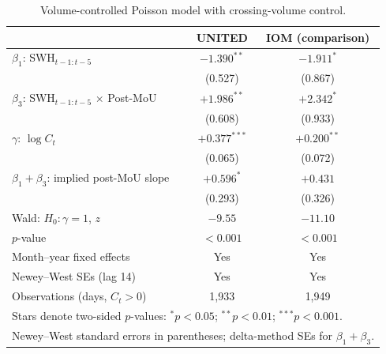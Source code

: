 \begin{table}[h!]
\centering
\small
\caption{Volume-controlled Poisson model with crossing-volume control.}
\label{tab:rate}
\begin{tabular}{lcc}
\hline
                              & UNITED & IOM (comparison) \\
\hline
$\beta_1$: SWH$_{t-1:t-5}$            & $-1.390^{**}$ & $-1.911^{*}$ \\
                                      & (0.527) & (0.867) \\
$\beta_3$: SWH$_{t-1:t-5}$ $\times$ Post-MoU & $+1.986^{**}$ & $+2.342^{*}$ \\
                                      & (0.608) & (0.933) \\
$\gamma$: $\log C_t$                  & $+0.377^{***}$ & $+0.200^{**}$ \\
                                      & (0.065) & (0.072) \\
$\beta_1+\beta_3$: implied post-MoU slope    & $+0.596^{*}$ & $+0.431$ \\
                                      & (0.293) & (0.326) \\
\hline
Wald: $H_{0}: \gamma = 1$, $z$        & $-9.55$ & $-11.10$ \\
$p$-value                             & $< 0.001$ & $< 0.001$ \\
Month--year fixed effects             & Yes            & Yes            \\
Newey--West SEs (lag 14)              & Yes            & Yes            \\
Observations (days, $C_t>0$)          & 1,933 & 1,949 \\
\hline
\multicolumn{3}{l}{\footnotesize Stars denote two-sided $p$-values: $^{*}p<0.05$; $^{**}p<0.01$; $^{***}p<0.001$.} \\
\multicolumn{3}{l}{\footnotesize Newey--West standard errors in parentheses; delta-method SEs for $\beta_1+\beta_3$.} \\
\end{tabular}
\end{table}
